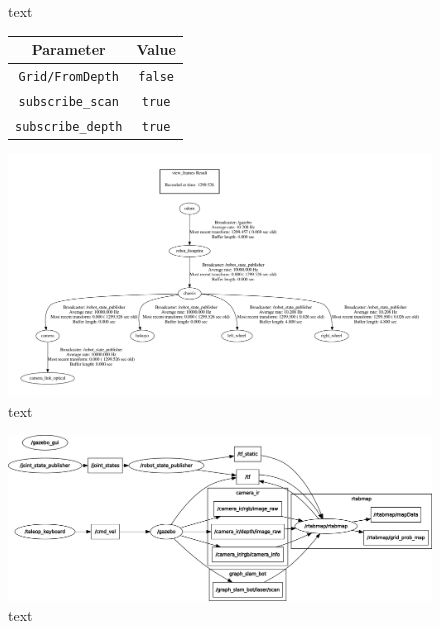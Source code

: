 \documentclass[a4paper]{article}
\begin{document}
\begin{figure}[h]
	\begin{minipage}{0.45\textwidth}
		text
	\end{minipage}
	\hspace{0.5cm}
	\begin{minipage}{0.45\textwidth}
		\centering
		\begin{tabular}{cc}
			\toprule
			\textbf{Parameter} & \textbf{Value}\\
			\midrule
			\texttt{Grid/FromDepth} & \texttt{false} \\
			\texttt{subscribe\_scan} & \texttt{true} \\
			\texttt{subscribe\_depth} & \texttt{true} \\
			\bottomrule
		\end{tabular}
	\end{minipage}
\end{figure}

\clearpage

\begin{figure}
	\centering
	\includegraphics[scale=0.5]{frames}
	\caption{text}
\end{figure}

\clearpage

\begin{figure}
	\centering
	\includegraphics[scale=0.4]{rosgraph}
	\caption{text}
\end{figure}
\end{document}

